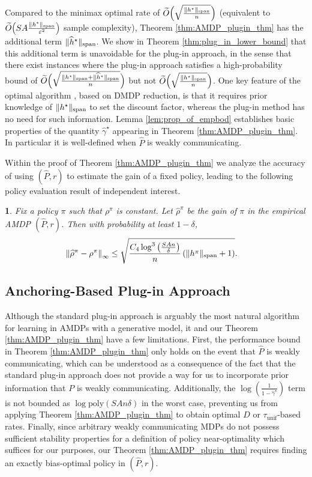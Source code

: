 \documentclass{article}
\theoremstyle{plain}
\newtheorem{thm}{\protect\theoremname}
\theoremstyle{plain}
\theoremstyle{remark}
\theoremstyle{plain}
\theoremstyle{plain}
\providecommand{\theoremname}{Theorem}
\newcommand{\Phat}{\widehat{P}}
\newcommand{\rhohat}{\widehat{\rho}}
\newcommand{\hhat}{\widehat{h}}
\newcommand{\Otilde}{\widetilde{O}}
\newcommand{\tmix}{\tau_{\mathrm{unif}}}
\newcommand\cig[1]{\scalerel*[5.5pt]{\Big#1}{%
  \ensurestackMath{\addstackgap[1.5pt]{\big#1}}}}
\newcommand{\empbod}{\widehat{\gamma}^\star}
\newcommand{\plugin}{plug-in\xspace}
\newcommand{\Plugin}{Plug-in\xspace}
\begin{document}
Compared to the minimax optimal rate of $\Otilde \Big(\sqrt{\frac{\spannorm{h^\star}}{n} }\Big)$ (equivalent to $\Otilde \cig( SA\frac{\spannorm{h^\star}}{\varepsilon^2} \cig)$ sample complexity), Theorem \ref{thm:AMDP_plugin_thm} has the additional term $\spannorm{\hhat^\star}$. We show in Theorem \ref{thm:plug_in_lower_bound} that this additional term is unavoidable for the \plugin approach, in the sense that there exist instances where the \plugin approach satisfies a high-probability bound of $\Otilde \Big(\sqrt{\frac{\spannorm{h^\star} + \spannorm{\hhat^\star}}{n} }\Big)$ but not $\Otilde \Big(\sqrt{\frac{\spannorm{h^\star}}{n} }\Big)$. One key feature of the optimal algorithm \citep{zurek_span-based_2025}, based on DMDP reduction, is that it requires prior knowledge of $\Vert h^\star\Vert _{\textnormal{span}}$ to set the discount factor, whereas the \plugin method has no need for such information.
Lemma \ref{lem:prop_of_empbod} establishes basic properties of the quantity $\empbod$ appearing in Theorem \ref{thm:AMDP_plugin_thm}. In particular it is well-defined when $\Phat$ is weakly communicating.

Within the proof of Theorem \ref{thm:AMDP_plugin_thm} we analyze the accuracy of using $(\Phat, r)$ to estimate the gain of a fixed policy, leading to the following policy evaluation result of independent interest.

\begin{thm}
\label{thm:AMDP_policy_eval}
    Fix a policy $\pi$ such that $\rho^\pi$ is constant. Let $\rhohat^\pi$ be the gain of $\pi$ in the empirical AMDP $(\Phat, r)$. Then with probability at least $1 - \delta$,
    \begin{align*}
        \infnorm{\rhohat^\pi - \rho^\pi} & \leq  \sqrt{\frac{C_4 \log^3 \left( \frac{SAn}{\delta} \right)}{n} \left( \spannorm{h^\pi}+1 \right)} . 
    \end{align*}
\end{thm}

\subsection{Anchoring-Based \Plugin Approach}

Although the standard \plugin approach is arguably the most natural algorithm for learning in AMDPs with a generative model, it and our Theorem \ref{thm:AMDP_plugin_thm} have a few limitations. First, the performance bound in Theorem \ref{thm:AMDP_plugin_thm} only holds on the event that $\Phat$ is weakly communicating, which can be understood as a consequence of the fact that the standard \plugin approach does not provide a way for us to incorporate prior information that $P$ is weakly communicating. Additionally, the $\log \left(\frac{1}{1-\empbod}\right)$ term is not bounded as $\log \text{poly}(SAn\delta)$ in the worst case, preventing us from applying Theorem \ref{thm:AMDP_plugin_thm} to obtain optimal $D$ or $\tmix$-based rates. Finally, since arbitrary weakly communicating MDPs do not possess sufficient stability properties for a definition of policy near-optimality which suffices for our purposes, our Theorem \ref{thm:AMDP_plugin_thm} requires finding an exactly bias-optimal policy in $(\Phat, r)$. 
\end{document}
